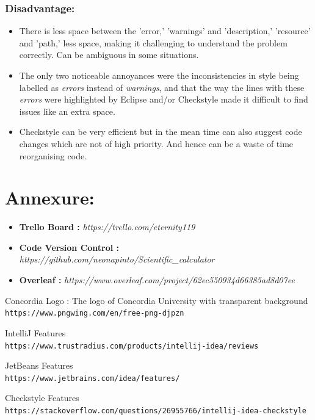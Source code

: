 \documentclass[letterpaper, 11pt]{article}
\begin{document}
    \subsubsection{\textbf{Disadvantage:}}
        \begin{itemize}
            \item There is less space between the 'error,' 'warnings'  and 'description,' 'resource' and 'path,' less space, making it challenging to understand the problem correctly. Can be ambiguous in some situations.
            \item The only two noticeable annoyances were the inconsistencies in style being labelled as \textit{errors} instead of \textit{warnings}, and that the way the lines with these \textit{errors} were highlighted by Eclipse and/or Checkstyle made it difficult to find issues like an extra space.
            \item Checkstyle can be very efficient but in the mean time can also suggest code changes which are not of high priority. And hence can be a waste of time reorganising code.
        \end{itemize}
    \pagebreak

\section{Annexure:}
    \begin{itemize}
      \item \textbf{Trello Board :} \textit{https://trello.com/eternity119}
      \item \textbf{Code Version Control :} \textit{https://github.com/neonapinto/Scientific\_calculator}
      \item \textbf{Overleaf :} \textit{https://www.overleaf.com/project/62ec550934d66385ad8d07ee}
    \end{itemize}
    
\pagebreak

\begin{thebibliography}{}      
Concordia Logo : The logo of Concordia University with transparent background
\\\texttt{https://www.pngwing.com/en/free-png-djpzn}

IntelliJ Features
\\\texttt{https://www.trustradius.com/products/intellij-idea/reviews}

JetBeans Features
\\\texttt{https://www.jetbrains.com/idea/features/}

Checkstyle Features
\\\texttt{https://stackoverflow.com/questions/26955766/intellij-idea-checkstyle}



\end{thebibliography}  
\end{document}

